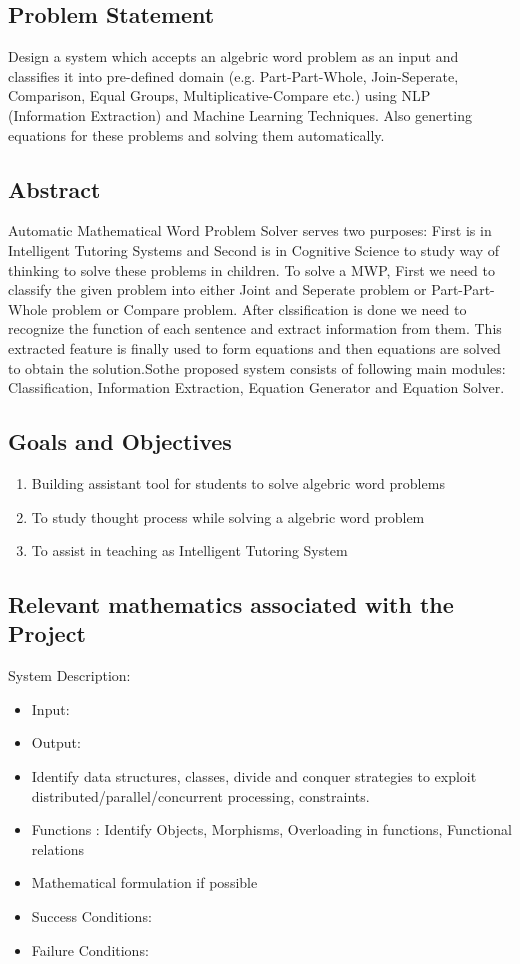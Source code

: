 \documentclass[12pt,a4paper]{article}
\begin{document}
\subsection{Problem Statement}
\label{sec:problem}
Design a system which accepts an algebric word problem
as an input and classifies it into pre-defined domain
(e.g. Part-Part-Whole, Join-Seperate, Comparison, Equal 
Groups, Multiplicative-Compare etc.) using NLP (Information 
Extraction) and Machine Learning Techniques. Also generting 
equations for these problems and solving them automatically.

\subsection{Abstract}
\label{sec:Abstract}
Automatic Mathematical Word Problem Solver serves two purposes: First is in Intelligent Tutoring Systems and Second is in Cognitive Science to
study way of thinking to solve these problems in children. To solve a
MWP, First we need to classify the given problem into either Joint and
Seperate problem or Part-Part-Whole problem or Compare problem. After
clssification is done we need to recognize the function of each sentence
and extract information from them. This extracted feature is finally used
to form equations and then equations are solved to obtain the solution.Sothe proposed system consists of following main modules: Classification,
Information Extraction, Equation Generator and Equation Solver.


\subsection{Goals and Objectives}
\begin{enumerate}
	\item Building assistant tool for students to solve algebric word problems
	\item To study thought process while solving a algebric word problem
	\item To assist in teaching as Intelligent Tutoring System
\end{enumerate}

	
\subsection{Relevant mathematics associated with the Project}
\label{sec:math}
System Description:
\begin{itemize} 
\item Input:	 
\item Output:	 
\item Identify data structures, classes, divide and conquer strategies to exploit distributed/parallel/concurrent processing, constraints. 
\item Functions : Identify Objects, Morphisms, Overloading in functions, Functional relations
\item Mathematical formulation if possible
\item Success Conditions:	 
\item Failure Conditions:		
\end{itemize}
\end{document}
